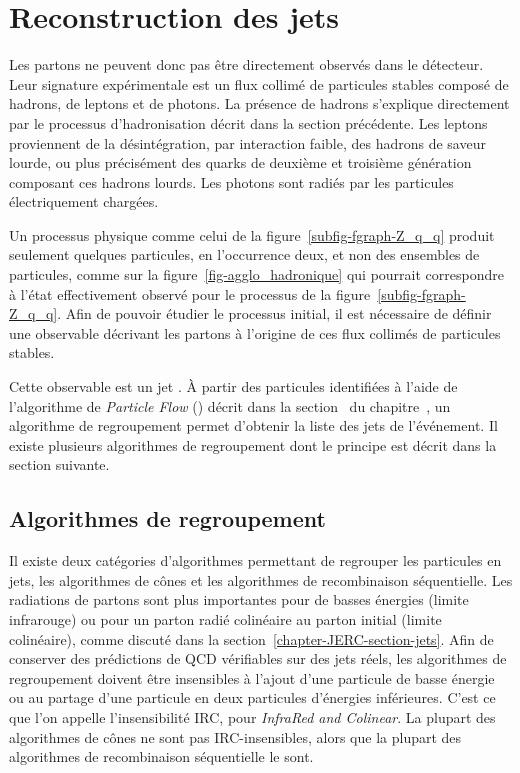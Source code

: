 \section{Reconstruction des jets}\label{chapter-JERC-section-jets_reco}
Les partons ne peuvent donc pas être directement observés dans le détecteur.
Leur signature expérimentale est un flux collimé de particules stables composé de hadrons, de leptons et de photons.
La présence de hadrons s'explique directement par le processus d'hadronisation décrit dans la section précédente.
Les leptons proviennent de la désintégration, par interaction faible, des hadrons de saveur lourde, ou plus précisément des quarks de deuxième et troisième génération composant ces hadrons lourds.
Les photons sont radiés par les particules électriquement chargées.
\par Un processus physique comme celui de la figure~\ref{subfig-fgraph-Z_q_q} produit seulement quelques particules, en l'occurrence deux, et non des ensembles de particules, comme sur la figure~\ref{fig-agglo_hadronique} qui pourrait correspondre à l'état effectivement observé pour le processus de la figure~\ref{subfig-fgraph-Z_q_q}.
Afin de pouvoir étudier le processus initial, il est nécessaire de définir une observable décrivant les partons à l'origine de ces flux collimés de particules stables.
\par Cette observable est un \og jet \fg.
À partir des particules identifiées à l'aide de l'algorithme de \emph{Particle Flow} (\PF) décrit dans la section~ du chapitre~, un algorithme de regroupement permet d'obtenir la liste des jets de l'événement.
Il existe plusieurs algorithmes de regroupement dont le principe est décrit dans la section suivante.
\subsection{Algorithmes de regroupement}\label{chapter-JERC-section-jets_reco-subsec-algo}
Il existe deux catégories d'algorithmes permettant de regrouper les particules en jets, les algorithmes de cônes et les algorithmes de recombinaison séquentielle.
Les radiations de partons sont plus importantes pour de basses énergies (limite infrarouge) ou pour un parton radié colinéaire au parton initial (limite colinéaire), comme discuté dans la section~\ref{chapter-JERC-section-jets}.
Afin de conserver des prédictions de QCD vérifiables sur des jets réels, les algorithmes de regroupement doivent être insensibles à l'ajout d'une particule de basse énergie ou au partage d'une particule en deux particules d'énergies inférieures. C'est ce que l'on appelle l'insensibilité IRC, pour \emph{InfraRed and Colinear}.
La plupart des algorithmes de cônes ne sont pas IRC-insensibles, alors que la plupart des algorithmes de recombinaison séquentielle le sont.
